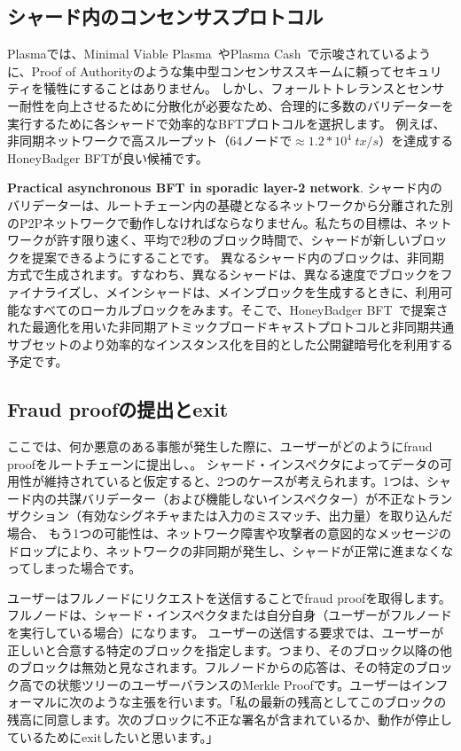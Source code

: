 \subsection{シャード内のコンセンサスプロトコル}\label{shard-consensus}
Plasmaでは、Minimal Viable Plasma~\cite{plasma-mvp}やPlasma Cash~\cite{plasma-cash}で示唆されているように、Proof of Authorityのような集中型コンセンサススキームに頼ってセキュリティを犠牲にすることはありません。 しかし、フォールトトレランスとセンサー耐性を向上させるために分散化が必要なため、合理的に多数のバリデーターを実行するために各シャードで効率的なBFTプロトコルを選択します。 例えば、非同期ネットワークで高スループット（64ノードで$\approx 1.2*10^4\hspace{3pt} tx/s$）を達成するHoneyBadger BFT\cite{honeybadger}が良い候補です。

\textbf{Practical asynchronous BFT in sporadic layer-2 network}.
シャード内のバリデーターは、ルートチェーン内の基礎となるネットワークから分離された別のP2Pネットワークで動作しなければならなりません。私たちの目標は、ネットワークが許す限り速く、平均で2秒のブロック時間で、シャードが新しいブロックを提案できるようにすることです。 異なるシャード内のブロックは、非同期方式で生成されます。すなわち、異なるシャードは、異なる速度でブロックをファイナライズし、メインシャードは、メインブロックを生成するときに、利用可能なすべてのローカルブロックをみます。そこで、HoneyBadger BFT~\cite{honeybadger}で提案された最適化を用いた非同期アトミックブロードキャストプロトコルと非同期共通サブセットのより効率的なインスタンス化を目的とした公開鍵暗号化を利用する予定です。

\subsection{Fraud proofの提出とexit}
ここでは、何か悪意のある事態が発生した際に、ユーザーがどのようにfraud proofをルートチェーンに提出し、。 シャード・インスペクタによってデータの可用性が維持されていると仮定すると、2つのケースが考えられます。1つは、シャード内の共謀バリデーター（および機能しないインスペクター）が不正なトランザクション（有効なシグネチャまたは入力のミスマッチ、出力量）を取り込んだ場合、 もう1つの可能性は、ネットワーク障害や攻撃者の意図的なメッセージのドロップにより、ネットワークの非同期が発生し、シャードが正常に進まなくなってしまった場合です。

ユーザーはフルノードにリクエストを送信することでfraud proofを取得します。フルノードは、シャード・インスペクタまたは自分自身（ユーザーがフルノードを実行している場合）になります。 ユーザーの送信する要求では、ユーザーが正しいと合意する特定のブロックを指定します。つまり、そのブロック以降の他のブロックは無効と見なされます。フルノードからの応答は、その特定のブロック高での状態ツリーのユーザーバランスのMerkle Proofです。ユーザーはインフォーマルに次のような主張を行います。「私の最新の残高としてこのブロックの残高に同意します。次のブロックに不正な署名が含まれているか、動作が停止しているためにexitしたいと思います。」

